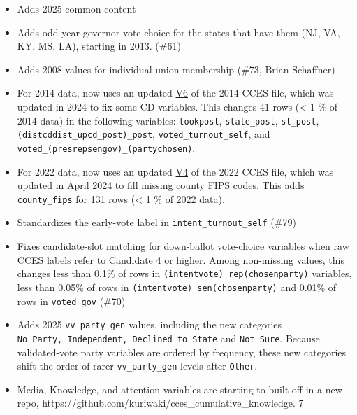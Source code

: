 \documentclass[10pt,article,oneside]{memoir}
\begin{document}
\begin{itemize}
\tightlist
\item
  Adds 2025 common content
\item
  Adds odd-year governor vote choice for the states that have them (NJ,
  VA, KY, MS, LA), starting in 2013. (\#61)
\item
  Adds 2008 values for individual union membership (\#73, Brian
  Schaffner)
\item
  For 2014 data, now uses an updated
  \href{https://dataverse.harvard.edu/file.xhtml?fileId=10703502&version=6.0}{V6}
  of the 2014 CCES file, which was updated in 2024 to fix some CD
  variables. This changes 41 rows (\textless{} 1 \% of 2014 data) in the
  following variables: \texttt{tookpost}, \texttt{state\_post},
  \texttt{st\_post},
  \texttt{(dist\textbar{}cd\textbar{}dist\_up\textbar{}cd\_post)\_post},
  \texttt{voted\_turnout\_self}, and
  \texttt{voted\_(pres\textbar{}rep\textbar{}sen\textbar{}gov)\_(party\textbar{}chosen\textbar{})}.
\item
  For 2022 data, now uses an updated
  \href{https://dataverse.harvard.edu/dataset.xhtml?persistentId=doi:10.7910/DVN/PR4L8P&version=4.0}{V4}
  of the 2022 CCES file, which was updated in April 2024 to fill missing
  county FIPS codes. This adds \texttt{county\_fips} for 131 rows
  (\textless{} 1 \% of 2022 data).
\item
  Standardizes the early-vote label in \texttt{intent\_turnout\_self}
  (\#79)
\item
  Fixes candidate-slot matching for down-ballot vote-choice variables
  when raw CCES labels refer to Candidate 4 or higher. Among non-missing
  values, this changes less than 0.1\% of rows in
  \texttt{(intent\textbar{}vote)\_rep(\textbar{}chosen\textbar{}party)}
  variables, less than 0.05\% of rows in
  \texttt{(intent\textbar{}vote)\_sen(\textbar{}chosen\textbar{}party)}
  and 0.01\% of rows in \texttt{voted\_gov} (\#70)
\item
  Adds 2025 \texttt{vv\_party\_gen} values, including the new categories
  \texttt{No\ Party,\ Independent,\ Declined\ to\ State} and
  \texttt{Not\ Sure}. Because validated-vote party variables are ordered
  by frequency, these new categories shift the order of rarer
  \texttt{vv\_party\_gen} levels after \texttt{Other}.
\item
  Media, Knowledge, and attention variables are starting to built off in
  a new repo, https://github.com/kuriwaki/cces\_cumulative\_knowledge. 7
\end{itemize}
\end{document}
